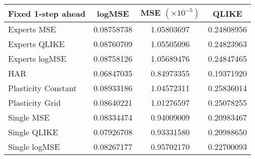 
\begin{tabular}{l|c|c|c}
Fixed 1-step ahead     & logMSE & MSE $(\times 10^{-5})$ & QLIKE \\\hline
Experts MSE & 0.08758738 & 1.05803697 & 0.24808956\\ 
Experts QLIKE & 0.08760709 & 1.05505096 & 0.24823963\\ 
Experts logMSE & 0.08758126 & 1.05689476 & 0.24847465\\ 
HAR & 0.06847035 & 0.84973355 & 0.19371920\\ 
Plasticity Constant & 0.08933186 & 1.04572311 & 0.25836014\\ 
Plasticity Grid & 0.08640221 & 1.01276597 & 0.25078255\\ 
Single MSE & 0.08334474 & 0.94009009 & 0.20983467\\ 
Single QLIKE & 0.07926708 & 0.93331580 & 0.20988650\\ 
Single logMSE & 0.08267177 & 0.95702170 & 0.22700093\\ 
\end{tabular}
